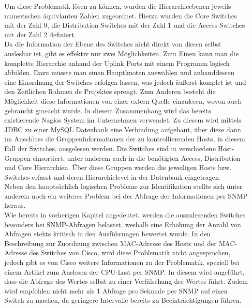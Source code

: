 Um diese Problematik lösen zu können, wurden die Hierarchieebenen jeweils numerischen äquivlanten Zahlen zugeordnet.
Hierzu wurden die Core Switches mit der Zahl 0, die Distribution Switches mit der Zahl 1 und die Access Switches mit der Zahl 2 definiert.\\
Da die Information der Ebene des Switches nicht direkt von diesen selbst auslesbar ist, gibt es effektiv nur zwei Möglichkeiten.
Zum Einen kann man die komplette Hierarchie anhand der Uplink Ports mit einem Programm logisch abbilden.
Dazu müsste man einen Hauptknoten auswählen und anhanddessen eine Einordnung der Switches erfolgen lassen, was jedoch äußerst komplet ist und den Zeitlichen Rahmen de Projektes sprengt.
Zum Anderen besteht die Möglichkeit diese Informationen von einer extern Quelle einzulesen, wovon auch gebraucht gmeacht wurde.
In diesem Zusammenhang wird das bereits existierende Nagios System im Unternehmen verwendet. Zu diesem wird mittels JDBC zu einer MySQL Datenbank eine Verbindung aufgebaut, über diese dann im Anschluss die Gruppeninformationen der zu kontrollierenden Hosts, in diesem Fall der Switches, ausgelesen werden. Die Switches sind in verschiedene Host-Gruppen einsortiert, unter anderem auch in die benötigten Access, Distribution und Core Hierarchien. Über diese Gruppen werden die jeweiligen Hosts bzw. Switches erfasst und deren Hierarchielevel in der Datenbank eingetragen.\\
Neben den hauptsächlich logischen Probleme zur Identifikation stellte sich unter anderem noch ein weiteres Problem bei der Abfrage der Informationen per SNMP heraus.\\
Wie bereits in vorherigen Kapitel angedeutet, werden die auszulesenden Switches besonders bei SNMP-Abfragen belastet, weshalb eine Erhöhung der Anzahl von Abfragen stehts kritisch in den Ausführungen bewertet wurde.
In den Beschreibung zur Zuordnung zwischen MAC-Adresse des Hosts und der MAC-Adresse des Switches von Cisco, wird diese Problematik nicht angesprochen, jedoch gibt es von Cisco weitere Informationen zu der Problematik, speziell bei einem Artikel zum Auslesen der CPU-Last per SNMP. In diesem wird angeführt, dass die Abfrage des Wertes selbst zu einer Verfälschung des Wertes führt. Zudem wird empfohlen nicht mehr als 1 Abfrage pro Sekunde per SNMP auf einen Switch zu machen, da geringere Intervalle bereits zu Beeinträchtigungen führen.
